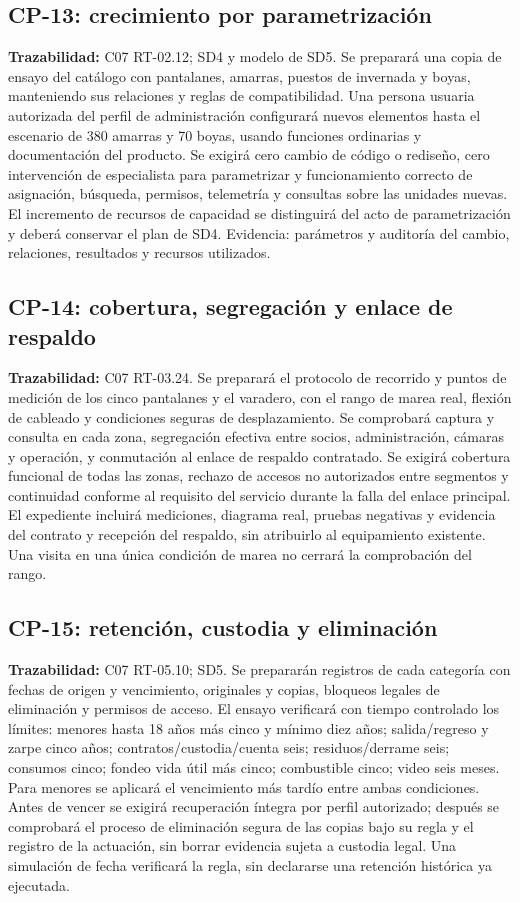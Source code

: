 \subsection{CP-13: crecimiento por parametrización}
\label{caso:cp-13}
\textbf{Trazabilidad:} C07 RT-02.12; SD4 y modelo de SD5. Se preparará una copia de ensayo del catálogo con pantalanes, amarras, puestos de invernada y boyas, manteniendo sus relaciones y reglas de compatibilidad. Una persona usuaria autorizada del perfil de administración configurará nuevos elementos hasta el escenario de 380 amarras y 70 boyas, usando funciones ordinarias y documentación del producto. Se exigirá cero cambio de código o rediseño, cero intervención de especialista para parametrizar y funcionamiento correcto de asignación, búsqueda, permisos, telemetría y consultas sobre las unidades nuevas. El incremento de recursos de capacidad se distinguirá del acto de parametrización y deberá conservar el plan de SD4. Evidencia: parámetros y auditoría del cambio, relaciones, resultados y recursos utilizados.

\subsection{CP-14: cobertura, segregación y enlace de respaldo}
\label{caso:cp-14}
\textbf{Trazabilidad:} C07 RT-03.24. Se preparará el protocolo de recorrido y puntos de medición de los cinco pantalanes y el varadero, con el rango de marea real, flexión de cableado y condiciones seguras de desplazamiento. Se comprobará captura y consulta en cada zona, segregación efectiva entre socios, administración, cámaras y operación, y conmutación al enlace de respaldo contratado. Se exigirá cobertura funcional de todas las zonas, rechazo de accesos no autorizados entre segmentos y continuidad conforme al requisito del servicio durante la falla del enlace principal. El expediente incluirá mediciones, diagrama real, pruebas negativas y evidencia del contrato y recepción del respaldo, sin atribuirlo al equipamiento existente. Una visita en una única condición de marea no cerrará la comprobación del rango.

\subsection{CP-15: retención, custodia y eliminación}
\label{caso:cp-15}
\textbf{Trazabilidad:} C07 RT-05.10; SD5. Se prepararán registros de cada categoría con fechas de origen y vencimiento, originales y copias, bloqueos legales de eliminación y permisos de acceso. El ensayo verificará con tiempo controlado los límites: menores hasta 18 años más cinco y mínimo diez años; salida/regreso y zarpe cinco años; contratos/custodia/cuenta seis; residuos/derrame seis; consumos cinco; fondeo vida útil más cinco; combustible cinco; video seis meses. Para menores se aplicará el vencimiento más tardío entre ambas condiciones. Antes de vencer se exigirá recuperación íntegra por perfil autorizado; después se comprobará el proceso de eliminación segura de las copias bajo su regla y el registro de la actuación, sin borrar evidencia sujeta a custodia legal. Una simulación de fecha verificará la regla, sin declararse una retención histórica ya ejecutada.

